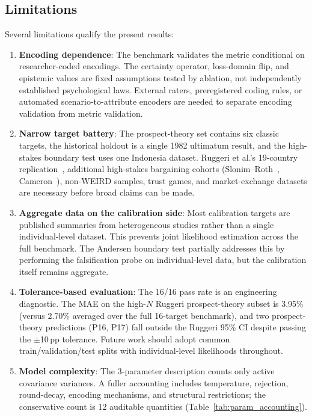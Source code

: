 \documentclass[journal]{IEEEtran}
\begin{document}
\subsection{Limitations}

Several limitations qualify the present results:
\begin{enumerate}
    \item \textbf{Encoding dependence}: The benchmark validates the metric conditional on researcher-coded encodings. The certainty operator, loss-domain flip, and epistemic values are fixed assumptions tested by ablation, not independently established psychological laws. External raters, preregistered coding rules, or automated scenario-to-attribute encoders are needed to separate encoding validation from metric validation.
    \item \textbf{Narrow target battery}: The prospect-theory set contains six classic targets, the historical holdout is a single 1982 ultimatum result, and the high-stakes boundary test uses one Indonesia dataset. Ruggeri et al.'s 19-country replication~\cite{ruggeri2020}, additional high-stakes bargaining cohorts (Slonim--Roth~\cite{slonim1998}, Cameron~\cite{cameron1999}), non-WEIRD samples, trust games, and market-exchange datasets are necessary before broad claims can be made.
    \item \textbf{Aggregate data on the calibration side}: Most calibration targets are published summaries from heterogeneous studies rather than a single individual-level dataset. This prevents joint likelihood estimation across the full benchmark. The Andersen boundary test partially addresses this by performing the falsification probe on individual-level data, but the calibration itself remains aggregate.
    \item \textbf{Tolerance-based evaluation}: The 16/16 pass rate is an engineering diagnostic. The MAE on the high-$N$ Ruggeri prospect-theory subset is 3.95\% (versus 2.70\% averaged over the full 16-target benchmark), and two prospect-theory predictions (P16, P17) fall outside the Ruggeri 95\% CI despite passing the $\pm$10\,pp tolerance. Future work should adopt common train/validation/test splits with individual-level likelihoods throughout.
    \item \textbf{Model complexity}: The 3-parameter description counts only active covariance variances. A fuller accounting includes temperature, rejection, round-decay, encoding mechanisms, and structural restrictions; the conservative count is 12 auditable quantities (Table~\ref{tab:param_accounting}).

\end{enumerate}
\end{document}
